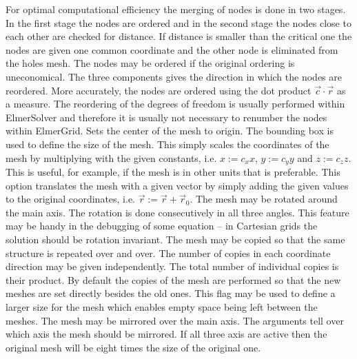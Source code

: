 For optimal computational efficiency the merging of nodes is done 
in two stages. In the first stage the nodes are ordered and in the second
stage the nodes close to each other are checked for distance. 
If distance is smaller than the critical one the nodes are given one
common coordinate and the other node is eliminated from the holes mesh.
%
The nodes may be ordered if the original ordering is uneconomical.
The three components gives the direction in which the nodes are reordered.
More accurately, the nodes are ordered using the 
dot product $\vec{c}\cdot\vec{r}$ as a measure.
%
The reordering of the degrees of freedom is usually performed 
within ElmerSolver and therefore 
it is usually not necessary to renumber the nodes within ElmerGrid.
%
Sets the center of the mesh to origin. The bounding box is used to define the size of the mesh. 
%
%
This simply scales the coordinates of the mesh by 
multiplying with the given constants, i.e.
$x:=c_x x$, $y:=c_y y$ and $z:=c_z z$.
This is useful, for example, if the mesh is in other units that is 
preferable. 
%
This option translates the mesh with a given vector by
simply adding the given values to the original coordinates,
i.e. $\vec{r} := \vec{r} + \vec{r}_0$.
%
The mesh may be rotated around the main axis. 
The rotation is done consecutively in all three angles.
This feature may be handy in the debugging of some equation --
in Cartesian grids the solution should be rotation invariant.
%
The mesh may be copied so that the same 
structure is repeated over and over. The number of copies in 
each coordinate direction may be given independently.
The total number of individual copies is their product.
%
By default the copies of the mesh are performed so that the 
new meshes are set directly besides the old ones. This flag may be used to define
a larger size for the mesh which enables empty space being left 
between the meshes.
%
The mesh may be mirrored over the main axis. The arguments 
tell over which axis the mesh should be mirrored. If all three axis
are active then the original mesh will be eight times the size of the original one.
